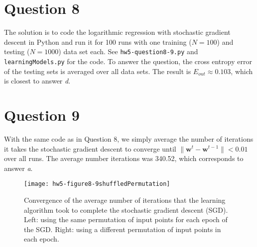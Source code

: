 \documentclass[	11pt,
				a4paper,
				twoside,
				titlepage,
				bibtotoc,
				openright,
				cleardoublepage=empty
				]{scrartcl}
\begin{document}
\clearpage

\section{Question 8} %
The solution is to code the logarithmic regression with stochastic gradient descent in Python and run it for 100 runs with one training ($N = 100$) and testing ($N = 1000$) data set each. See \verb|hw5-question8-9.py| and \verb|learningModels.py| for the code.
To answer the question, the cross entropy error of the testing sets is averaged over all data sets. The result is $E_{out} \approx 0.103$, which is closest to answer \emph{d}.
 




\section{Question 9} %
With the same code as in Question 8, we simply average the number of iterations it takes the stochastic gradient descent to converge until $\| \mathbf{w}^{t} - \mathbf{w}^{t-1} \| < 0.01$ over all runs. The average number iterations was 340.52, which corresponds to answer \emph{a}.
\begin{figure}[!h]
	\texttt{[image: hw5-figure8-9shuffledPermutation]}
	\caption{Convergence of the average number of iterations that the learning algorithm took to complete the stochastic gradient descent (SGD). Left: using the same permutation of input points for each epoch of the SGD. Right: using a different permutation of input points in each epoch.}
	\end{figure}



\clearpage
\end{document}
